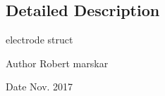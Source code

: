 \subsection{Detailed Description}
electrode struct 

\begin{DoxyAuthor}{Author}
Robert marskar 
\end{DoxyAuthor}
\begin{DoxyDate}{Date}
Nov. 2017 
\end{DoxyDate}
